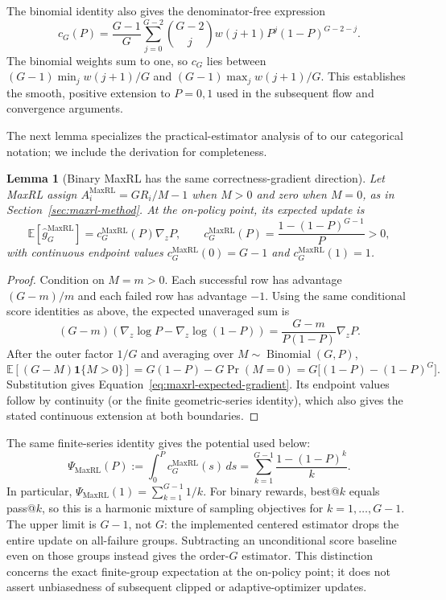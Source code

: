 \documentclass{article}
\newcommand{\1}{\mathbf 1}
\newcommand{\E}{\mathbb E}
\newtheorem{lemma}{Lemma}[section]
\theoremstyle{remark}
\theoremstyle{definition}
\theoremstyle{plain}
\begin{document}
The binomial identity also gives the denominator-free expression
\[
 c_G(P)=\frac{G-1}{G}\sum_{j=0}^{G-2}\binom{G-2}{j}
 w(j+1)P^j(1-P)^{G-2-j}.
\]
The binomial weights sum to one, so $c_G$ lies between
$(G-1)\min_j w(j+1)/G$ and $(G-1)\max_j w(j+1)/G$.
This establishes the smooth, positive extension to $P=0,1$ used in the
subsequent flow and convergence arguments.

The next lemma specializes the practical-estimator analysis of
\citet[Section~4.3 and Appendix~D, Theorem~5]{tajwar2026maxrl}
to our categorical notation; we include the derivation for completeness.

\begin{lemma}[Binary MaxRL has the same correctness-gradient direction]
\label{lem:maxrl-mean}
Let MaxRL assign
$A_i^{\mathrm{MaxRL}}=GR_i/M-1$ when $M>0$ and zero when $M=0$, as in
Section~\ref{sec:maxrl-method}. At the on-policy point, its expected update is
\begin{equation}
  \E[\widehat g_G^{\mathrm{MaxRL}}]
  =c_G^{\mathrm{MaxRL}}(P)\nabla_zP,
  \qquad
  c_G^{\mathrm{MaxRL}}(P)
  =\frac{1-(1-P)^{G-1}}{P}>0,
  \label{eq:maxrl-expected-gradient}
\end{equation}
with continuous endpoint values
$c_G^{\mathrm{MaxRL}}(0)=G-1$ and
$c_G^{\mathrm{MaxRL}}(1)=1$.
\end{lemma}

\begin{proof}
Condition on $M=m>0$. Each successful row has advantage $(G-m)/m$ and each
failed row has advantage $-1$. Using the same conditional score identities as
above, the expected unaveraged sum is
\[
  (G-m)\!\left(\nabla_z\log P-\nabla_z\log(1-P)\right)
  =\frac{G-m}{P(1-P)}\nabla_zP.
\]
After the outer factor $1/G$ and averaging over
$M\sim\operatorname{Binomial}(G,P)$,
\[
 \E[(G-M)\1\{M>0\}]
 =G(1-P)-G\Pr(M=0)
 =G\big[(1-P)-(1-P)^G\big].
\]
Substitution gives Equation~\eqref{eq:maxrl-expected-gradient}. Its endpoint
values follow by continuity (or the finite geometric-series identity), which
also gives the stated continuous extension at both boundaries.
\end{proof}

The same finite-series identity gives the potential used below:
\begin{equation}
 \Psi_{\mathrm{MaxRL}}(P)
 :=\int_0^P c_G^{\mathrm{MaxRL}}(s)\,ds
 =\sum_{k=1}^{G-1}\frac{1-(1-P)^k}{k}.
 \label{eq:maxrl-potential-finite-sum}
\end{equation}
In particular, $\Psi_{\mathrm{MaxRL}}(1)=\sum_{k=1}^{G-1}1/k$.
For binary rewards, best@\(k\) equals pass@\(k\), so this is a harmonic
mixture of sampling objectives for $k=1,\ldots,G-1$. The upper limit is
$G-1$, not $G$: the implemented centered estimator drops the entire update
on all-failure groups. Subtracting an unconditional score baseline even on
those groups instead gives the order-$G$ estimator. This distinction concerns
the exact finite-group expectation at the on-policy point; it does not assert
unbiasedness of subsequent clipped or adaptive-optimizer updates.
\end{document}
